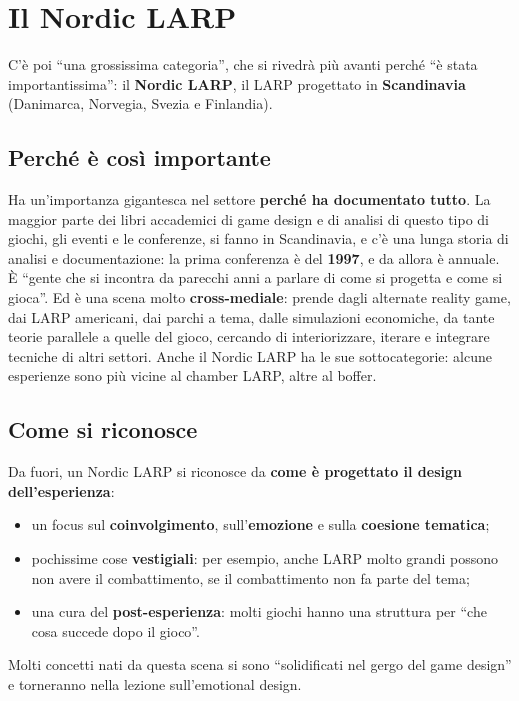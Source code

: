 \section{Il Nordic LARP}
\label{a2:sec:nordic}



C'è poi ``una grossissima categoria'', che si rivedrà più avanti perché ``è stata
importantissima'': il \textbf{Nordic LARP}, il LARP progettato in
\textbf{Scandinavia} (Danimarca, Norvegia, Svezia e Finlandia).

\subsection{Perché è così importante}

Ha un'importanza gigantesca nel settore \textbf{perché ha documentato tutto}. La
maggior parte dei libri accademici di game design e di analisi di questo tipo di
giochi, gli eventi e le conferenze, si fanno in Scandinavia, e c'è una lunga
storia di analisi e documentazione: la prima conferenza è del \textbf{1997}, e da
allora è annuale. È ``gente che si incontra da parecchi anni a parlare di come si
progetta e come si gioca''. Ed è una scena molto \textbf{cross-mediale}: prende
dagli alternate reality game, dai LARP americani, dai parchi a tema, dalle
simulazioni economiche, da tante teorie parallele a quelle del gioco, cercando
di interiorizzare, iterare e integrare tecniche di altri settori. Anche il Nordic
LARP ha le sue sottocategorie: alcune esperienze sono più vicine al chamber
LARP, altre al boffer.

\subsection{Come si riconosce}

Da fuori, un Nordic LARP si riconosce da \textbf{come è progettato il design
dell'esperienza}:
\begin{itemize}
  \item un focus sul \textbf{coinvolgimento}, sull'\textbf{emozione} e sulla
        \textbf{coesione tematica};
  \item pochissime cose \textbf{vestigiali}: per esempio, anche LARP molto
        grandi possono non avere il combattimento, se il combattimento non fa
        parte del tema;
  \item una cura del \textbf{post-esperienza}: molti giochi hanno una
        struttura per ``che cosa succede dopo il gioco''.
\end{itemize}
Molti concetti nati da questa scena si sono ``solidificati nel gergo del game
design'' e torneranno nella lezione sull'emotional design.

